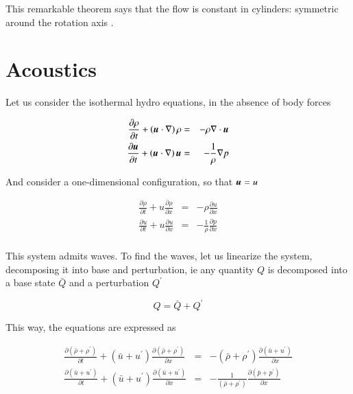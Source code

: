 This remarkable theorem says that the flow is constant in cylinders:
symmetric around the rotation axis .



\section{Acoustics}

Let us consider the isothermal hydro equations, in the absence of body forces 

\begin{eqnarray}
\frac{\partial \rho}{\partial t}  + \left({\boldsymbol{u}}\cdot \nabla\right)\rho  &=& -\rho \nabla \cdot {\boldsymbol{u}}   \\
\frac{\partial {\boldsymbol{u}}}{\partial t}  +  \left({\boldsymbol{u}}\cdot \nabla\right) {\boldsymbol{u}} &=& -\frac{1}{\rho} \nabla p 
\end{eqnarray}




And consider a one-dimensional configuration, so that ${\boldsymbol{u}}=u$

\begin{eqnarray}
\frac{\partial \rho}{\partial t}  + u\frac{\partial \rho}{\partial x} &=& -\rho\frac{\partial u}{\partial x}    \\
\frac{\partial u}{\partial t}  +  u\frac{\partial u}{\partial x} &=& -\frac{1}{\rho} \frac{\partial p}{\partial x}  \\
\end{eqnarray}

This system admits waves. To find the waves, let us linearize the system, decomposing it into base and perturbation, ie any quantity $Q$ is decomposed into a base state $\bar{Q}$ and a perturbation $Q^\prime$

\begin{equation}
Q = \bar{Q} + Q^\prime
\end{equation}

This way, the equations are expressed as  


\begin{eqnarray}
\frac{\partial (\bar{\rho}+\rho^\prime)}{\partial t}  + (\bar{u}+u^\prime)\frac{\partial (\bar{\rho}+\rho^\prime)}{\partial x} &=& -(\bar{\rho}+\rho^\prime)\frac{\partial (\bar{u}+u^\prime)}{\partial x}   \\
\frac{\partial (\bar{u}+u^\prime)}{\partial t}  +  (\bar{u}+u^\prime)\frac{\partial (\bar{u}+u^\prime)}{\partial x} &=& -\frac{1}{(\bar{\rho}+\rho^\prime)} \frac{\partial (\bar{p}+p^\prime)}{\partial x} 
\end{eqnarray}

